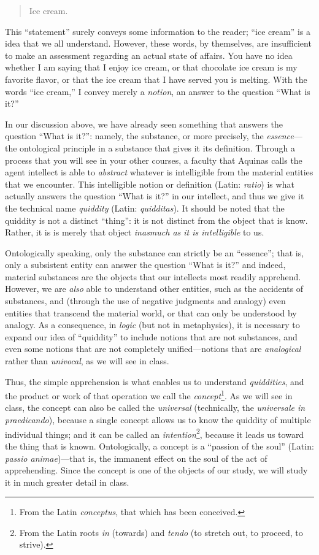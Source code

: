 \documentclass[
  12pt,
]{memoir}
\begin{document}
\begin{quote}
Ice cream.
\end{quote}

\noindent This ``statement'' surely conveys some information to the
reader; ``ice cream'' is a idea that we all understand. However, these
words, by themselves, are insufficient to make an assessment regarding
an actual state of affairs. You have no idea whether I am saying that I
enjoy ice cream, or that chocolate ice cream is my favorite flavor, or
that the ice cream that I have served you is melting. With the words
``ice cream,'' I convey merely a \emph{notion}, an answer to the
question ``What is it?''

In our discussion above, we have already seen something that answers the
question ``What is it?'': namely, the substance, or more precisely, the
\emph{essence}---the ontological principle in a substance that gives it
its definition. Through a process that you will see in your other
courses, a faculty that Aquinas calls the agent intellect is able to
\emph{abstract} whatever is intelligible from the material entities that
we encounter. This intelligible notion or definition (Latin:
\emph{ratio}) is what actually answers the question ``What is it?'' in
our intellect, and thus we give it the technical name \emph{quiddity}
(Latin: \emph{quidditas}). It should be noted that the quiddity is not a
distinct ``thing'': it is not distinct from the object that is know.
Rather, it is is merely that object \emph{inasmuch as it is
intelligible} to us.

Ontologically speaking, only the substance can strictly be an
``essence''; that is, only a subsistent entity can answer the question
``What is it?'' and indeed, material substances are the objects that our
intellects most readily apprehend. However, we are \emph{also} able to
understand other entities, such as the accidents of substances, and
(through the use of negative judgments and analogy) even entities that
transcend the material world, or that can only be understood by analogy.
As a consequence, in \emph{logic} (but not in metaphysics), it is
necessary to expand our idea of ``quiddity'' to include notions that are
not substances, and even some notions that are not completely
unified---notions that are \emph{analogical} rather than
\emph{univocal}, as we will see in class.

Thus, the simple apprehension is what enables us to understand
\emph{quiddities}, and the product or work of that operation we call the
\emph{concept}\footnote{From the Latin \emph{conceptus}, that which has
  been conceived.}. As we will see in class, the concept can also be
called the \emph{universal} (technically, the \emph{universale in
praedicando}), because a single concept allows us to know the quiddity
of multiple individual things; and it can be called an
\emph{intention}\footnote{From the Latin roots \emph{in} (towards) and
  \emph{tendo} (to stretch out, to proceed, to strive).}, because it
leads us toward the thing that is known. Ontologically, a concept is a
``passion of the soul'' (Latin: \emph{passio animae})---that is, the
immanent effect on the soul of the act of apprehending. Since the
concept is one of the objects of our study, we will study it in much
greater detail in class.
\end{document}
